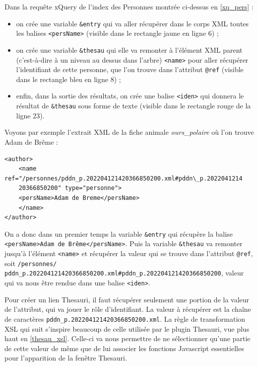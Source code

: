 \documentclass[a4paper,12pt,twoside]{book}
\begin{document}
Dans la requête xQuery de l'index des Personnes montrée ci-dessus en \ref{xq_pers} :
\begin{itemize}
    \item on crée une variable \texttt{\&entry} qui va aller récupérer dans le corps XML toutes les balises \texttt{<persName>} (visible dans le rectangle jaune en ligne 6) ;
    \item on crée une variable \texttt{\&thesau} qui elle va remonter à l'élément XML parent (c'est-à-dire à un niveau au dessus dans l'arbre) \texttt{<name>} pour aller récupérer l'identifiant de cette personne, que l'on trouve dans l'attribut \texttt{@ref} (visible dans le rectangle bleu en ligne 8) ;
    \item enfin, dans la sortie des résultats, on crée une balise \texttt{<iden>} qui donnera le résultat de \texttt{\&thesau} sous forme de texte (visible dans le rectangle rouge de la ligne 23).
\end{itemize}


Voyons par exemple l'extrait XML de la fiche animale \textit{ours\_polaire} où l'on trouve Adam de Brême :\\


\begin{verbatim}
<author>
    <name ref="/personnes/pddn_p.202204121420366850200.xml#pddn\_p.2022041214
    20366850200" type="personne">
    <persName>Adam de Breme</persName>
    </name>
</author>
\end{verbatim}

On a donc dans un premier temps la variable \texttt{\&entry} qui récupère la balise\\ \texttt{<persName>Adam de Brême</persName>}. Puis la variable \texttt{\&thesau} va remonter jusqu'à l'élément \texttt{<name>} et récupérer la valeur qui se trouve dans l'attribut \texttt{@ref}, soit  \og \texttt{/personnes/\\pddn\_p.202204121420366850200.xml\#pddn\_p.202204121420366850200}\fg, valeur qui va nous être rendue dans une balise \texttt{<iden>}.



Pour créer un lien Thesauri, il faut récupérer seulement une portion de la valeur de l'attribut, qui va jouer le rôle d'identifiant. La valeur à récupérer est la chaîne de caractères \texttt{pddn\_p.202204121420366850200.xml}. La règle de transformation \acrshort{XSL} qui suit s'inspire beaucoup de celle utilisée par le plugin Thesauri, vue plus haut en \ref{thesau_xsl}. Celle-ci va nous permettre de ne sélectionner qu'une partie de cette valeur de même que de lui associer les fonctions Javascript essentielles pour l'apparition de la fenêtre Thesauri.
\end{document}
